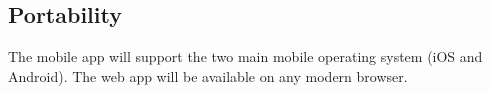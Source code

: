 \subsection{Portability}
The mobile app will support the two main mobile operating system (iOS and Android). The web app will be available on any modern browser.